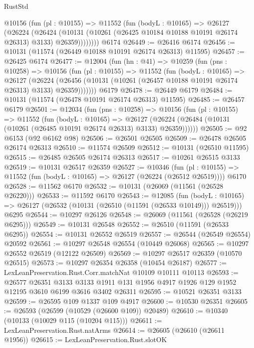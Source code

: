 \begin{lexlean}{RustStd}
\begin{coremodule}
        @10156
          (fun (pl : @10155) =>
          @11552
            (fun (bodyL : @10165) =>
            @26127
              (@26224
                (@26424
                  (@10131 (@10261 (@26425 @10184 @10188 @10191 @26174 @26313) @3133) @26359))))))))
    @6174
@26449 := @26416 @6174
@26456 := @10131 (@11574 (@26449 @10188 @10191 @26174 @26313) @11595)
@26457 := @26425 @6174
@26477 := @12004
    (fun (hn : @41) =>
    @10259
      (fun (pns : @10258) =>
      @10156
        (fun (pl : @10155) =>
        @11552
          (fun (bodyL : @10165) =>
          @26127
            (@26224
              (@26456 (@10131 (@10261 (@26457 @10188 @10191 @26174 @26313) @3133) @26359)))))))
    @6179
@26478 := @26449 @6179
@26484 := @10131 (@11574 (@26478 @10191 @26174 @26313) @11595)
@26485 := @26457 @6179
@26501 := @12034
    (fun (pns : @10258) =>
    @10156
      (fun (pl : @10155) =>
      @11552
        (fun (bodyL : @10165) =>
        @26127 (@26224 (@26484 (@10131 (@10261 (@26485 @10191 @26174 @26313) @3133) @26359))))))
@26505 := @92 @6153 (@92 @6162 @98)
@26506 := @26501 @26505
@26509 := @26478 @26505 @26174 @26313
@26510 := @11574 @26509
@26512 := @10131 (@26510 @11595)
@26515 := @26485 @26505 @26174 @26313
@26517 := @10261 @26515 @3133
@26519 := @10131 @26517 @26359
@26527 := @10346
    (fun (pl : @10155) => @11552 (fun (bodyL : @10165) => @26127 (@26224 (@26512 @26519))))
    @6170
@26528 := @11562 @6170
@26532 := @10131 (@26069 (@11561 (@26528 @26220)))
@26533 := @11592 @6170
@26543 := @12085
    (fun (bodyL : @10165) => @26127 (@26532 (@10131 (@26510 (@11591 (@26533 @10149))) @26519)))
    @6295
@26544 := @10297 @26126
@26548 := @26069 (@11561 (@26528 (@26219 @6295)))
@26549 := @10131 @26548
@26552 := @26510 (@11591 (@26533 @6295))
@26554 := @10131 @26552 @26519
@26557 := @26544 (@26549 @26554) @20592
@26561 := @10297 @26548 @26554 (@10449 @26068)
@26565 := @10297 @26552 @26519 (@12122 @26509)
@26569 := @10297 @26517 @26359 (@10570 @26515)
@26573 := @10297 @26354 @26358 (@10454 @26187)
@26577 := LexLeanPreservation.Rust.Corr.matchNat @10109 @10111 @10113
@26593 := @26577
    @26351
    @3133
    @3133
    @1911
    @131
    @1956
    @4917
    @1926
    @129
    @1952
    @12195
    @3610
    @6199
    @3616
    @3402
    @26311
@26595 := @10521 @26351 @3133
@26599 := @26595 @109 @1337 @109 @4917
@26600 := @10530 @26351
@26605 := @26593 (@26599 (@10529 (@26600 @109)) @20489)
@26610 := @10340 (@10133 (@10029 @115 (@10204 @115)))
@26611 := LexLeanPreservation.Rust.natArms
@26614 := @26605 (@26610 (@26611 @1956))
@26615 := LexLeanPreservation.Rust.slotOK

\end{coremodule}
\end{lexlean}
